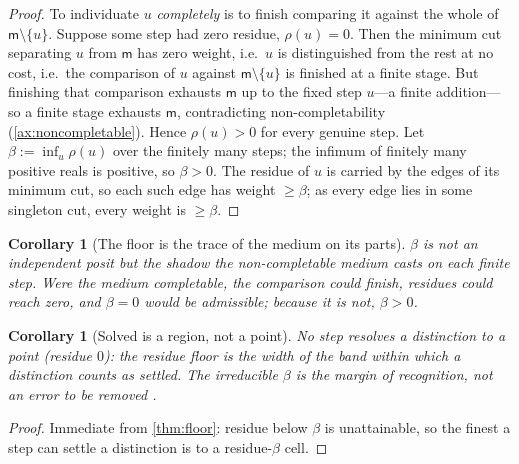 \documentclass[11pt,twocolumn,a4paper]{article}
\theoremstyle{thmstyle}
\newtheorem{corollary}[theorem]{Corollary}
\theoremstyle{definition}
\theoremstyle{remark}
\newcommand{\med}{\mathsf{m}}           %
\newcommand{\flo}{\beta}                %
\newcommand{\res}{\rho}                 %
\newcommand{\set}[1]{\{#1\}}
\begin{document}
\begin{proof}
To individuate $u$ \emph{completely} is to finish comparing it against the whole
of $\med\setminus\set u$. Suppose some step had zero residue, $\res(u)=0$. Then
the minimum cut separating $u$ from $\med$ has zero weight, i.e.\ $u$ is
distinguished from the rest at no cost, i.e.\ the comparison of $u$ against
$\med\setminus\set u$ is finished at a finite stage. But finishing that
comparison exhausts $\med$ up to the fixed step $u$---a finite addition---so a
finite stage exhausts $\med$, contradicting non-completability
(\cref{ax:noncompletable}). Hence $\res(u)>0$ for every genuine step. Let
$\flo:=\inf_u\res(u)$ over the finitely many steps; the infimum of finitely many
positive reals is positive, so $\flo>0$. The residue of $u$ is carried by the
edges of its minimum cut, so each such edge has weight $\ge\flo$; as every edge
lies in some singleton cut, every weight is $\ge\flo$.
\end{proof}

\begin{corollary}[The floor is the trace of the medium on its parts]
\label{cor:trace}
$\flo$ is not an independent posit but the shadow the non-completable medium
casts on each finite step. Were the medium completable, the comparison could
finish, residues could reach zero, and $\flo=0$ would be admissible; because it
is not, $\flo>0$.
\end{corollary}

\begin{corollary}[Solved is a region, not a point]
\label{cor:region}
No step resolves a distinction to a point (residue $0$): the residue floor is
the width of the band within which a distinction counts as settled. The
irreducible $\flo$ is the margin of recognition, not an error to be removed
\citep{black1937}.
\end{corollary}

\begin{proof}
Immediate from \cref{thm:floor}: residue below $\flo$ is unattainable, so the
finest a step can settle a distinction is to a residue-$\flo$ cell.
\end{proof}
\end{document}
